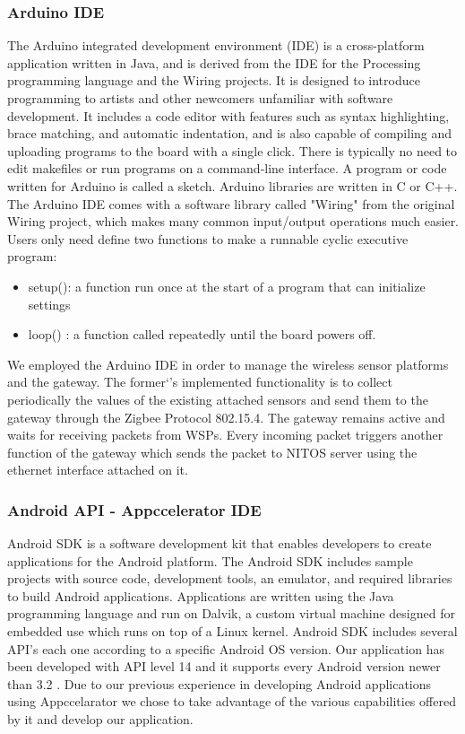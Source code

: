 \documentclass[conference]{IEEEtran}
\begin{document}
\subsubsection{Arduino IDE}
The Arduino integrated development environment (IDE) \cite{arduino-ide} is a cross-platform application written in Java, and is derived from the IDE for the Processing programming language and the Wiring projects.
It is designed to introduce programming to artists and other newcomers unfamiliar with software development. 
It includes a code editor with features such as syntax highlighting, brace matching, and automatic indentation, and is also capable of compiling and uploading programs to the board with a single click. 
There is typically no need to edit makefiles or run programs on a command-line interface. A program or code written for Arduino is called a sketch. 
Arduino libraries are written in C or C++. 
The Arduino IDE comes with a software library called "Wiring" from the original Wiring project, which makes many common input/output operations much easier. 
Users only need define two functions to make a runnable cyclic executive program:
\begin{itemize}
\item setup():  a function run once at the start of a program that can initialize settings
\item loop()  :  a function called repeatedly until the board powers off.
\end{itemize}

We employed the Arduino IDE in order to manage the wireless sensor platforms and the gateway. 
The former`’s implemented functionality is to collect periodically the values of the existing attached sensors and send them to the gateway through the Zigbee Protocol 802.15.4. 
The gateway remains active and waits for receiving packets from WSPs.
Every incoming packet triggers another function of the gateway which sends the packet to NITOS server using the ethernet interface attached on it.  

\subsubsection{Android API - Appccelerator IDE}
Android SDK is a software development kit that enables developers to create applications for the Android platform. 
The Android SDK includes sample projects with source code, development tools, an emulator, and required libraries to build Android applications. 
Applications are written using the Java programming language and run on Dalvik, a custom virtual machine designed for embedded use which runs on top of a Linux kernel. 
Android SDK includes several API’s each one according to a specific Android OS version. 
Our application has been developed with API level 14 and it supports every Android version newer than 3.2 .
Due to our previous experience in developing Android applications using Appccelarator we chose to take advantage of the various capabilities offered by it and develop our application.  
\end{document}
